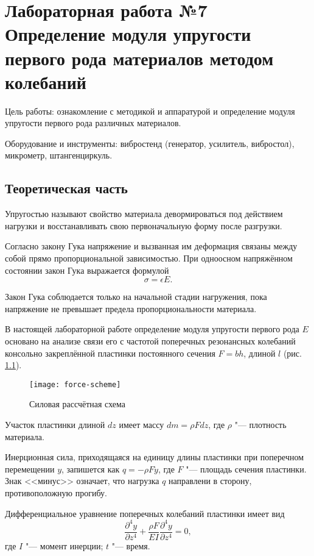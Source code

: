 \chapter{Лабораторная работа №7 \\
\Large Определение модуля упругости первого рода материалов методом колебаний}

Цель работы: ознакомление с методикой и аппаратурой и определение модуля упругости первого рода различных материалов.

Оборудование и инструменты: вибростенд (генератор, усилитель, вибростол), микрометр, штангенциркуль.

\section{Теоретическая часть}

Упругостью называют свойство материала девормироваться под действием нагрузки и восстанавливать свою первоначальную форму после разгрузки.

Согласно закону Гука напряжение и вызванная им деформация связаны между собой прямо пропорциональной зависимостью.
При одноосном напряжённом состоянии закон Гука выражается формулой
\[
    \sigma = \epsilon E.
\]

Закон Гука соблюдается только на начальной стадии нагружения, пока напряжение не превышает предела пропорциональности материала.

В настоящей лабораторной работе определение модуля упругости первого рода $E$ основано на анализе связи его с частотой поперечных резонансных колебаний консольно закреплённой пластинки постоянного сечения $F = bh$, длиной $l$ (рис. \ref{fig:force-scheme}).

\begin{figure}[!ht]
    \centering
    \texttt{[image: force-scheme]}
    \caption{Силовая рассчётная схема}
    \label{fig:force-scheme}
\end{figure}

Участок пластинки длиной $dz$ имеет массу $dm = \rho F dz$, где $\rho$ "--- плотность материала.

Инерционная сила, приходящаяся на единицу длины пластинки при поперечном перемещении $y$, запишется как $q = -\rho F \ddot{y}$, где $F$ "--- площадь сечения пластинки.
Знак <<минус>> означает, что нагрузка $q$ направлени в сторону, противоположную прогибу.

Дифференциальное уравнение поперечных колебаний пластинки имеет вид
\begin{equation}\label{eq:partial-equation}
    \frac{\partial^4 y}{\partial z^4} + \frac{\rho F}{E I} \frac{\partial^4 y}{\partial z^4} = 0,
\end{equation}
где $I$ "--- момент инерции; $t$ "--- время.

